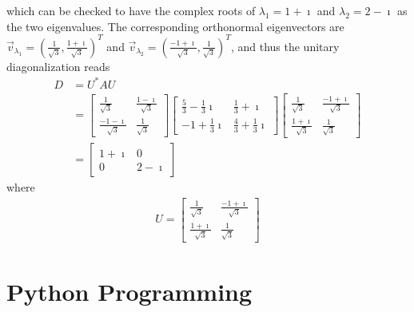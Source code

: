 \begin{solution}
which can be checked to have the complex roots of $\lambda_1 = 1+\imath$ and $\lambda_2 = 2-\imath$ as the two eigenvalues. The corresponding orthonormal eigenvectors are $\vec{v}_{\lambda_1} = (\frac{1}{\sqrt{3}}, \frac{1+\imath}{\sqrt{3}})^T$ and $\vec{v}_{\lambda_2} = (\frac{-1+\imath}{\sqrt{3}}, \frac{1}{\sqrt{3}})^T$, and thus the unitary diagonalization reads
\begin{align*}
D &= U^*AU \\
&= 
\begin{bmatrix}
\frac{1}{\sqrt{3}} & \frac{1-\imath}{\sqrt{3}} \\ 
\frac{-1-\imath}{\sqrt{3}}  & \frac{1}{\sqrt{3}}
\end{bmatrix}
\begin{bmatrix}
\frac{5}{3}-\frac{1}{3}\imath &\frac{1}{3}+\imath \\ 
-1+\frac{1}{3}\imath & \frac{4}{3}+\frac{1}{3}\imath
\end{bmatrix}
\begin{bmatrix}
\frac{1}{\sqrt{3}} & \frac{-1+\imath}{\sqrt{3}} \\ 
\frac{1+\imath}{\sqrt{3}} & \frac{1}{\sqrt{3}}
\end{bmatrix} \\
&= 
\begin{bmatrix}
1+\imath & 0 \\
0 & 2-\imath
\end{bmatrix}
\end{align*}
where
\begin{align*}
U = \begin{bmatrix}
\frac{1}{\sqrt{3}} & \frac{-1+\imath}{\sqrt{3}} \\ 
\frac{1+\imath}{\sqrt{3}} & \frac{1}{\sqrt{3}}
\end{bmatrix} 
\end{align*}
\end{solution}

\section{Python Programming}

